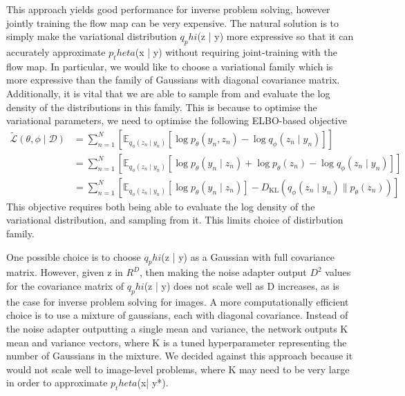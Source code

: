 \documentclass[12pt,a4paper]{report}
\begin{document}
This approach yields good performance for inverse problem solving, however jointly training the flow map can be very expensive. 
The natural solution is to simply make the variational distribution $q_phi$(z | y) more expressive so that it can accurately approximate $p_theta$(x | y) without requiring joint-training with the flow map. 
In particular, we would like to choose a variational family which is more expressive than the family of Gaussians with diagonal covariance matrix. 
Additionally, it is vital that we are able to sample from and evaluate the log density of the distributions in this family. 
This is because to optimise the variational parameters, we need to optimise the following ELBO-based objective 
\begin{align}
\tilde{\mathcal{L}}(\theta, \phi \mid \mathcal{D}) &= \sum_{n=1}^N \left[ \mathbb{E}_{q_\phi(z_n \mid y_n)} [\log p_\theta(y_n, z_n) - \log q_\phi(z_n \mid y_n)] \right] \label{eq:VFM_simple_ELBO} \\
&= \sum_{n=1}^N \left[ \mathbb{E}_{q_\phi(z_n \mid y_n)} [\log p_\theta(y_n \mid z_n) + \log p_\theta(z_n) - \log q_\phi(z_n \mid y_n)] \right] \nonumber \\
&= \sum_{n=1}^N \left[ \mathbb{E}_{q_\phi(z_n \mid y_n)} [\log p_\theta(y_n \mid z_n)] - D_{\text{KL}}(q_\phi(z_n \mid y_n) \parallel p_\theta(z_n)) \right] \label{eq:VFM_simple_ELBO_massaged} 
\end{align}
This objective requires both being able to evaluate the log density of the variational distribution, and sampling from it. 
This limits choice of distirbution family. 

One possible choice is to choose $q_phi$(z | y) as a Gaussian with full covariance matrix. 
However, given z in $R^D$, then making the noise adapter output $D^2$ values for the covariance matrix of $q_phi$(z | y) does not scale well as D increases, as is the case for inverse problem solving for images. 
A more computationally efficient choice is to use a mixture of gaussians, each with diagonal covariance. 
Instead of the noise adapter outputting a single mean and variance, the network outputs K mean and variance vectors, where K is a tuned hyperparameter representing the number of Gaussians in the mixture. 
We decided against this approach because it would not scale well to image-level problems, where K may need to be very large in order to approximate $p_theta$(x| y*). 
\end{document}
